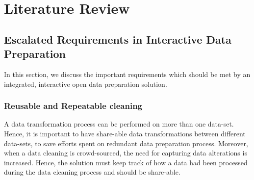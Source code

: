
\chapter{Literature Review} %
\label{Chapter2} %


\section{Escalated Requirements in Interactive Data Preparation}
\label{sec:requirements}
In this section, we discuss the important requirements which should be met by an integrated, interactive open data preparation solution. 
\subsection{Reusable and Repeatable cleaning}
\noindent A data transformation process can be performed on more than one data-set. Hence, it is important to have share-able data transformations between different data-sets, to save efforts spent on redundant data preparation process. Moreover, when a data cleaning is crowd-sourced, the need for capturing data alterations is increased\cite{2011-wrangler}.  Hence, the solution must keep track of how a data had been processed during the data cleaning process and should be share-able. 


